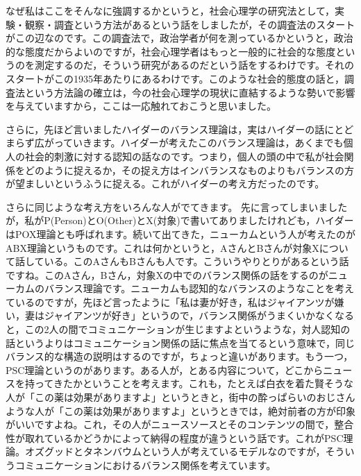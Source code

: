 \documentclass{ltjsbook}
\begin{document}
なぜ私はここをそんなに強調するかというと，社会心理学の研究法として，実験・観察・調査という方法があるという話をしましたが，その調査法のスタートがこの辺なのです。この調査法で，政治学者が何を測っているかというと，政治的な態度だからよいのですが，社会心理学者はもっと一般的に社会的な態度というのを測定するのだ，そういう研究があるのだという話をするわけです。それのスタートがこの1935年あたりにあるわけです。このような社会的態度の話と，調査法という方法論の確立は，今の社会心理学の現状に直結するような勢いで影響を与えていますから，ここは一応触れておこうと思いました。

さらに，先ほど言いましたハイダーのバランス理論は，実はハイダーの話にとどまらず広がっていきます。ハイダーが考えたこのバランス理論は，あくまでも個人の社会的刺激に対する認知の話なのです。つまり，個人の頭の中で私が社会関係をどのように捉えるか，その捉え方はインバランスなものよりもバランスの方が望ましいというふうに捉える。これがハイダーの考え方だったのです。

さらに同じような考え方をいろんな人がでてきます。
先に言ってしまいましたが，私がP(Person)とO(Other)とX(対象)で書いてありましたけれども，ハイダーはPOX理論とも呼ばれます。続いて出てきた，ニューカムという人が考えたのがABX理論というものです。これは何かというと，AさんとBさんが対象Xについて話している。このAさんもBさんも人です。こういうやりとりがあるという話ですね。このAさん，Bさん，対象Xの中でのバランス関係の話をするのがニューカムのバランス理論です。ニューカムも認知的なバランスのようなことを考えているのですが，先ほど言ったように「私は妻が好き，私はジャイアンツが嫌い，妻はジャイアンツが好き」というので，バランス関係がうまくいかなくなると，この2人の間でコミュニケーションが生じますよというような，対人認知の話というよりはコミュニケーション関係の話に焦点を当てるという意味で，同じバランス的な構造の説明はするのですが，ちょっと違いがあります。もう一つ，PSC理論というのがあります。ある人が，とある内容について，どこからニュースを持ってきたかということを考えます。これも，たとえば白衣を着た賢そうな人が「この薬は効果がありますよ」というときと，街中の酔っぱらいのおじさんような人が「この薬は効果がありますよ」というときでは，絶対前者の方が印象がいいですよね。これ，その人がニュースソースとそのコンテンツの間で，整合性が取れているかどうかによって納得の程度が違うという話です。これがPSC理論。オズグッドとタネンバウムという人が考えているモデルなのですが，そういうコミュニケーションにおけるバランス関係を考えています。
\end{document}
